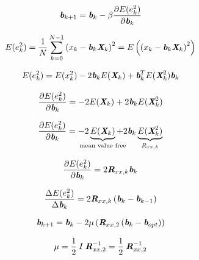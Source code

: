 \documentclass[
    10pt, %
    DIV12,
    english, %
    a5paper, %
    twoside, %
    titlepage, %
    parskip=half, %
    headings=small, %
    listof=totoc, %
    bibliography=totoc, %
    index=totoc, %
    captions=tableheading, %
    final %
]{scrbook}
\begin{document}
\begin{equation}
\textit{\textbf{b}}_{k+1}=\textit{\textbf{b}}_k-\beta \frac{\partial E(e_k^2)}{\partial \textit{\textbf{b}}_k}
\end{equation}

\begin{equation}
E(e_k^2) = \frac{1}{N}\sum_{k=0}^{N-1}\left(x_k-\textit{\textbf{b}}_k\textit{\textbf{X}}_k\right)^2=E\left(\left(x_k-\textit{\textbf{b}}_k\textit{\textbf{X}}_k\right)^2\right) \nonumber
\end{equation}

\begin{equation}
E(e_k^2) = E(x_k^2)-2\textit{\textbf{b}}_k E(\textit{\textbf{X}}_k)+\textit{\textbf{b}}_k^T E(\textit{\textbf{X}}_k^2)\textit{\textbf{b}}_k\nonumber
\end{equation}

\begin{equation}
\frac{\partial E(e_k^2) }{\partial \textit{\textbf{b}}_k}= -2 E(\textit{\textbf{X}}_k)+2 \textit{\textbf{b}}_k E(\textit{\textbf{X}}_k^2)\nonumber
\end{equation}

\begin{equation}
\frac{\partial E(e_k^2) }{\partial \textit{\textbf{b}}_k}= -2 \underbrace{E(\textit{\textbf{X}}_k)}_\text{\clap{mean value free}}+2 \textit{\textbf{b}}_k \underbrace{E(\textit{\textbf{X}}_k^2)}_\text{\clap{$R_{xx,k}$}}\nonumber
\end{equation}

\begin{equation}
\frac{\partial E(e_k^2)}{\partial \textit{\textbf{b}}_k}=2\textit{\textbf{R}}_{xx,k}\textit{\textbf{b}}_k\nonumber
\end{equation}

\begin{equation}
\frac{\Delta E(e_k^2)}{\Delta \textit{\textbf{b}}_k}=2\textit{\textbf{R}}_{xx,k}\left(\textit{\textbf{b}}_k-\textit{\textbf{b}}_{k-1}\right)\nonumber
\end{equation}

\begin{equation}
\textit{\textbf{b}}_{k+1}=\textit{\textbf{b}}_k-2\mu\left(\textit{\textbf{R}}_{xx,2}\left(\textit{\textbf{b}}_k-\textit{\textbf{b}}_{opt}\right)\right)\nonumber
\end{equation}

\begin{equation}
\mu=\frac{1}{2}\:I\:\textit{\textbf{R}}_{xx,2}^{-1}=\frac{1}{2}\:\textit{\textbf{R}}_{xx,2}^{-1}\nonumber
\end{equation}
\end{document}
